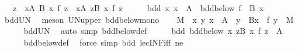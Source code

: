 \begin{isabellebody}
\ \ \ {\isachardoublequoteopen}{\isacharparenleft}{\kern0pt}{\isasymSqinter}z\ {\isasymin}\ {\isasymUnion}x{\isasymin}A{\isachardot}{\kern0pt}\ B\ x{\isachardot}{\kern0pt}\ f\ z{\isacharparenright}{\kern0pt}\ {\isacharequal}{\kern0pt}\ {\isacharparenleft}{\kern0pt}{\isasymSqinter}x{\isasymin}A{\isachardot}{\kern0pt}\ {\isasymSqinter}z{\isasymin}B\ x{\isachardot}{\kern0pt}\ f\ z{\isacharparenright}{\kern0pt}{\isachardoublequoteclose}\isanewline
%
\isadelimproof
%
\endisadelimproof
%
\isatagproof
{}\isamarkupfalse%
\ {\isacharminus}{\kern0pt}\isanewline
\ \ \isamarkupfalse%
\ bdd{\isacharcolon}{\kern0pt}\ {\isachardoublequoteopen}{\isasymAnd}x{\isachardot}{\kern0pt}\ x\ {\isasymin}\ A\ {\isasymLongrightarrow}\ bdd{\isacharunderscore}{\kern0pt}below\ {\isacharparenleft}{\kern0pt}f\ {\isacharbackquote}{\kern0pt}\ B\ x{\isacharparenright}{\kern0pt}{\isachardoublequoteclose}\isanewline
\ \ \ \ \isamarkupfalse%
\ bdd{\isacharunderscore}{\kern0pt}UN\ \isamarkupfalse%
\ {\isacharparenleft}{\kern0pt}meson\ UN{\isacharunderscore}{\kern0pt}upper\ bdd{\isacharunderscore}{\kern0pt}below{\isacharunderscore}{\kern0pt}mono{\isacharparenright}{\kern0pt}\isanewline
\ \ \isamarkupfalse%
\ M\ \ {\isachardoublequoteopen}{\isasymAnd}x\ y{\isachardot}{\kern0pt}\ x\ {\isasymin}\ A\ {\isasymLongrightarrow}\ y\ {\isasymin}\ B{\isacharparenleft}{\kern0pt}x{\isacharparenright}{\kern0pt}\ {\isasymLongrightarrow}\ f\ y\ {\isasymge}\ M{\isachardoublequoteclose}\isanewline
\ \ \ \ \isamarkupfalse%
\ bdd{\isacharunderscore}{\kern0pt}UN\ \isamarkupfalse%
\ {\isacharparenleft}{\kern0pt}auto\ simp{\isacharcolon}{\kern0pt}\ bdd{\isacharunderscore}{\kern0pt}below{\isacharunderscore}{\kern0pt}def{\isacharparenright}{\kern0pt}\isanewline
\ \ \isamarkupfalse%
\ \isamarkupfalse%
\ bdd{}{\isacharcolon}{\kern0pt}\ {\isachardoublequoteopen}bdd{\isacharunderscore}{\kern0pt}below\ {\isacharparenleft}{\kern0pt}{\isacharparenleft}{\kern0pt}{\isasymlambda}x{\isachardot}{\kern0pt}\ {\isasymSqinter}z{\isasymin}B\ x{\isachardot}{\kern0pt}\ f\ z{\isacharparenright}{\kern0pt}\ {\isacharbackquote}{\kern0pt}\ A{\isacharparenright}{\kern0pt}{\isachardoublequoteclose}\isanewline
\ \ \ \ \isamarkupfalse%
\ bdd{\isacharunderscore}{\kern0pt}below{\isacharunderscore}{\kern0pt}def\ \isamarkupfalse%
\ {\isacharparenleft}{\kern0pt}force\ simp{\isacharcolon}{\kern0pt}\ bdd\ le{\isacharunderscore}{\kern0pt}cINF{\isacharunderscore}{\kern0pt}iff\ ne{\isacharparenleft}{\kern0pt}{}{\isacharparenright}{\kern0pt}{\isacharparenright}{\kern0pt}\isanewline

\end{isabellebody}
